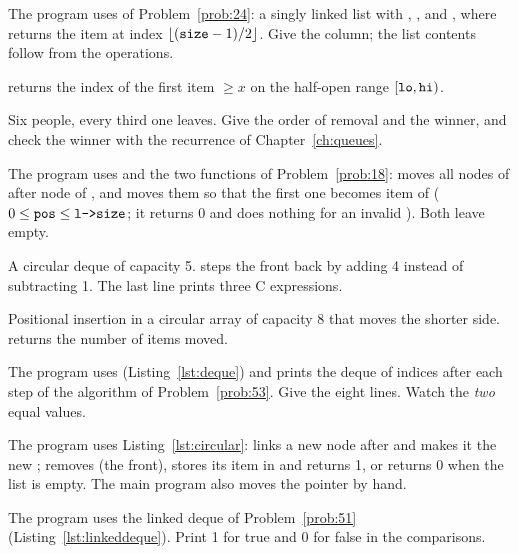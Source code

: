 The program uses  of Problem~\ref{prob:24}: a singly linked list with
, ,  and , where  returns the item at
index $\lfloor(\texttt{size}-1)/2\rfloor$. Give the  column; the list contents follow
from the operations.

 returns the index of the first item $\ge x$ on the half-open range
$[\texttt{lo},\texttt{hi})$.

Six people, every third one leaves. Give the order of removal and the winner, and check
the winner with the recurrence of Chapter~\ref{ch:queues}.

The program uses  and the two functions of Problem~\ref{prob:18}:
 moves all nodes of  after node  of , and
 moves them so that the first one becomes item  of 
($0\le\texttt{pos}\le\texttt{l->size}$; it returns 0 and does nothing for an invalid
). Both leave  empty.


A circular deque of capacity 5.  steps the front back by adding 4 instead
of subtracting 1. The last line prints three C expressions.

Positional insertion in a circular array of capacity 8 that moves the shorter side.
 returns the number of items moved.

The program uses  (Listing~\ref{lst:deque}) and prints the deque of indices
after each step of the algorithm of Problem~\ref{prob:53}. Give the eight lines. Watch the
\emph{two} equal values.

The program uses Listing~\ref{lst:circular}:  links a new node after
 and makes it the new ;  removes 
(the front), stores its item in  and returns 1, or returns 0 when the list is empty.
The main program also moves the pointer by hand.

The program uses the linked deque of Problem~\ref{prob:51} (Listing~\ref{lst:linkeddeque}).
Print 1 for true and 0 for false in the comparisons.
